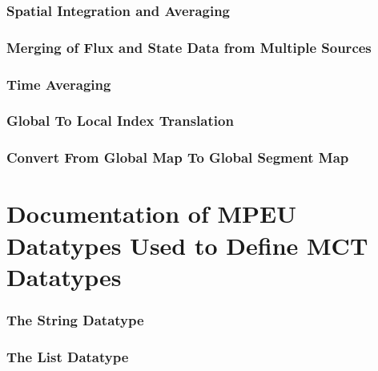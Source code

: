\documentclass{article}
\begin{document}
\section{Spatial Integration and Averaging}

\vspace*{\fill}
\newpage

\vspace*{\fill}
\newpage
%
\section{Merging of Flux and State Data from Multiple Sources}

\vspace*{\fill}
\newpage
%
\section{Time Averaging}

\vspace*{\fill}
\newpage
%

\vspace*{\fill}
\newpage
%
\section{Global To Local Index Translation}

\vspace*{\fill}
\newpage
%
\section{Convert From Global Map To Global Segment Map}

\vspace*{\fill}
\newpage

\part{Documentation of MPEU Datatypes Used to Define MCT Datatypes}
%
\section{The String Datatype} 

\vspace*{\fill}
\newpage
%
\section{The List Datatype}

\vspace*{\fill}
\newpage


 
%
\end{document}
